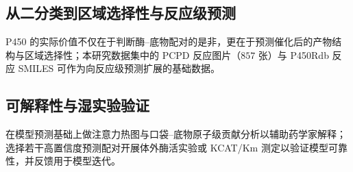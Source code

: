 \subsection{从二分类到区域选择性与反应级预测}
\label{subsec:future-reaction}

P450 的实际价值不仅在于判断酶--底物配对的是非，更在于预测催化后的产物结构与区域选择性；本研究数据集中的 PCPD 反应图片（$857$ 张）与 P450Rdb 反应 SMILES 可作为向反应级预测扩展的基础数据。

\subsection{可解释性与湿实验验证}
\label{subsec:future-validate}

在模型预测基础上做注意力热图与口袋--底物原子级贡献分析以辅助药学家解释；选择若干高置信度预测配对开展体外酶活实验或 KCAT/Km 测定以验证模型可靠性，并反馈用于模型迭代。
